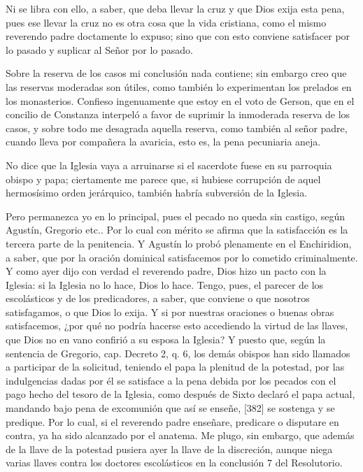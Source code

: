 Ni se libra con ello, a saber, que deba llevar la cruz y que Dios exija esta pena, pues ese llevar la cruz no es otra cosa que la vida cristiana, como el mismo reverendo padre doctamente lo expuso; sino que con esto conviene satisfacer por lo pasado y suplicar al Señor por lo pasado.

Sobre la reserva de los casos mi conclusión nada contiene; sin embargo creo que las reservas moderadas son útiles, como también lo experimentan los prelados en los monasterios. Confieso ingenuamente que estoy en el voto de Gerson, que en el concilio de Constanza interpeló a favor de suprimir la inmoderada reserva de los casos, y sobre todo me desagrada aquella reserva, como también al señor padre, cuando lleva por compañera la avaricia, esto es, la pena pecuniaria aneja.

No dice que la Iglesia vaya a arruinarse si el sacerdote fuese en su parroquia obispo y papa; ciertamente me parece que, si hubiese corrupción de aquel hermosísimo orden jerárquico, también habría subversión de la Iglesia.

Pero permanezca yo en lo principal, pues el pecado no queda sin castigo, según Agustín, Gregorio etc.. Por lo cual con mérito se afirma que la satisfacción es la tercera parte de la penitencia. Y Agustín lo probó plenamente en el Enchiridion, a saber, que por la oración dominical satisfacemos por lo cometido criminalmente. Y como ayer dijo con verdad el reverendo padre, Dios hizo un pacto con la Iglesia: si la Iglesia no lo hace, Dios lo hace. Tengo, pues, el parecer de los escolásticos y de los predicadores, a saber, que conviene o que nosotros satisfagamos, o que Dios lo exija. Y si por nuestras oraciones o buenas obras satisfacemos, ¿por qué no podría hacerse esto accediendo la virtud de las llaves, que Dios no en vano confirió a su esposa la Iglesia? Y puesto que, según la sentencia de Gregorio, cap. Decreto 2, q. 6, los demás obispos han sido llamados a participar de la solicitud, teniendo el papa la plenitud de la potestad, por las indulgencias dadas por él se satisface a la pena debida por los pecados con el pago hecho del tesoro de la Iglesia, como después de Sixto declaró el papa actual, mandando bajo pena de excomunión que así se enseñe, [382] se sostenga y se predique. Por lo cual, si el reverendo padre enseñare, predicare o disputare en contra, ya ha sido alcanzado por el anatema. Me plugo, sin embargo, que además de la llave de la potestad pusiera ayer la llave de la discreción, aunque niega varias llaves contra los doctores escolásticos en la conclusión 7 del Resolutorio.

